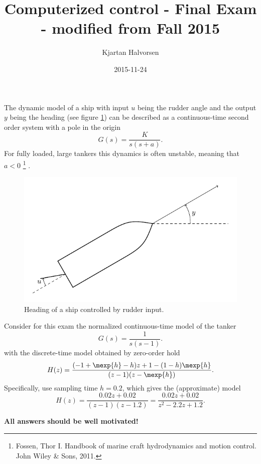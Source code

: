 \documentclass{scrartcl}
\author{Kjartan Halvorsen}
\date{2015-11-24}
\title{Computerized control - Final Exam - modified from Fall 2015}
\begin{document}
\maketitle
The dynamic model of a ship with input \(u\) being the rudder angle and the output \(y\) being the heading (see figure \ref{fig:tanker}) can be described as a continuous-time second order system with a pole in the origin
\[ G(s) = \frac{K}{s(s + a)}. \]
For fully loaded, large tankers this dynamics is often unstable, meaning that \(a<0\) \footnote{Fossen, Thor I. Handbook of marine craft hydrodynamics and motion control. John Wiley \& Sons, 2011.} .  
\begin{figure}[h]
\begin{center}
\includegraphics[]{tanker}
\caption{Heading of a ship controlled by rudder input.}
\label{fig:tanker}
\end{center}
\end{figure}

Consider for this exam the normalized continuous-time model of the tanker
\[ G(s) = \frac{1}{s(s - 1)}. \]
with the discrete-time model obtained by zero-order hold
\begin{equation*}
 H(z) = \frac{(-1+\mexp{h} -h)z + 1 - (1-h)\mexp{h}}{(z-1)(z-\mexp{h})}.
\end{equation*}
Specifically, use sampling time \(h=0.2\), which gives the (approximate) model
\begin{equation}
 H(z) = \frac{0.02z + 0.02}{(z-1)(z-1.2)} = \frac{0.02z + 0.02}{z^2-2.2z+1.2}.
\label{eq:model}
\end{equation}

\textbf{All answers should be well motivated!}
\end{document}
